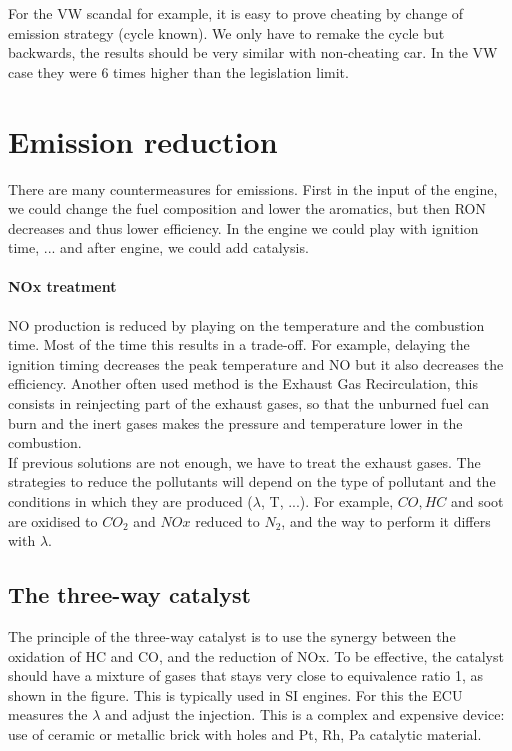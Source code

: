 	For the VW scandal for example, it is easy to prove cheating by change of emission strategy (cycle known). We only have to remake the cycle but backwards, the results should be very similar with non-cheating car. In the VW case they were 6 times higher than the legislation limit. 
	
\section{Emission reduction}
	There are many countermeasures for emissions. First in the input of the engine, we could change the fuel composition and lower the aromatics, but then RON decreases and thus lower efficiency. In the engine we could play with ignition time, ... and after engine, we could add catalysis. 

	\paragraph{NOx treatment}	
	NO production is reduced by playing on the temperature and the combustion time. Most of the time this results in a trade-off. For example, delaying the ignition timing decreases the peak temperature and NO but it also decreases the efficiency. Another often used method is the Exhaust Gas Recirculation, this consists in reinjecting part of the exhaust gases, so that the unburned fuel can burn and the inert gases makes the pressure and temperature lower in the combustion.\\
	
	If previous solutions are not enough, we have to treat the exhaust gases. The strategies to reduce the pollutants will depend on the type of pollutant and the conditions in which they are produced ($\lambda$, T, ...). For example, $CO, HC$ and soot are oxidised to $CO_2$ and $NOx$ reduced to $N_2$, and the way to perform it differs with $\lambda$. 
	
\subsection{The three-way catalyst}
		
	The principle of the three-way catalyst is to use the synergy between the oxidation of HC and CO, and the reduction of NOx. To be effective, the catalyst should have a mixture of gases that stays very close to equivalence ratio 1, as shown in the figure. This is typically used in SI engines. For this the ECU measures the $\lambda$ and adjust the injection. This is a complex and expensive device: use of ceramic or metallic brick with holes and Pt, Rh, Pa catalytic material. \\
	
